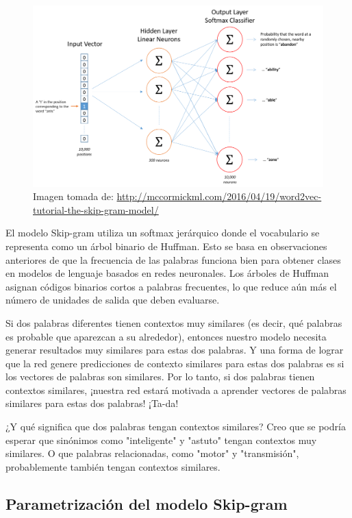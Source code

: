 \begin{figure}[h]
\centering
\includegraphics[scale=0.4]{pics/skip_gram_net_arch.png}
\caption{Imagen tomada de: \url{http://mccormickml.com/2016/04/19/word2vec-tutorial-the-skip-gram-model/}}
\end{figure}



El modelo Skip-gram utiliza un softmax jerárquico donde el vocabulario se representa como un árbol binario de Huffman.
Esto se basa en observaciones anteriores de que la frecuencia de las palabras funciona bien para obtener clases en modelos de lenguaje basados en redes neuronales.
Los árboles de Huffman asignan códigos binarios cortos a palabras frecuentes, lo que reduce aún más el número de unidades de salida que deben evaluarse.

Si dos palabras diferentes tienen contextos muy similares (es decir, qué palabras es probable que aparezcan a su alrededor), entonces nuestro modelo necesita generar resultados muy similares para estas dos palabras.
Y una forma de lograr que la red genere predicciones de contexto similares para estas dos palabras es si los vectores de palabras son similares.
Por lo tanto, si dos palabras tienen contextos similares, ¡nuestra red estará motivada a aprender vectores de palabras similares para estas dos palabras! ¡Ta-da!

¿Y qué significa que dos palabras tengan contextos similares? Creo que se podría esperar que sinónimos como "inteligente" y "astuto" tengan contextos muy similares.
O que palabras relacionadas, como "motor" y "transmisión", probablemente también tengan contextos similares.

\subsection{Parametrización del modelo Skip-gram}

